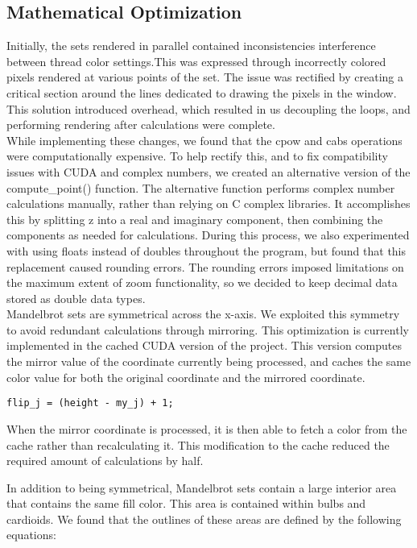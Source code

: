 \documentclass{article}
\begin{document}
\subsection{Mathematical Optimization}

Initially, the sets rendered in parallel contained inconsistencies interference between thread color settings.This was expressed through incorrectly colored pixels rendered at various points of the set.
The issue was rectified by creating a critical section around the lines dedicated to drawing the pixels in the window.
This solution introduced overhead, which resulted in us decoupling the loops, and performing rendering after calculations were complete.\\

While implementing these changes, we found that the cpow and cabs operations were computationally expensive.
To help rectify this, and to fix compatibility issues with CUDA and complex numbers, we created an alternative version of the compute\_point() function.
The alternative function performs complex number calculations manually, rather than relying on C complex libraries.
It accomplishes this by splitting z into a real and imaginary component, then combining the components as needed for calculations.
During this process, we also experimented with using floats instead of doubles throughout the program, but found that this replacement caused rounding errors.
The rounding errors imposed limitations on the maximum extent of zoom functionality, so we decided to keep decimal data stored as double data types.\\

Mandelbrot sets are symmetrical across the x-axis.
We exploited this symmetry to avoid redundant calculations through mirroring.
This optimization is currently implemented in the cached CUDA version of the project.
This version computes the mirror value of the coordinate currently being processed, and caches the same color value for both the original coordinate and the mirrored coordinate.

\begin{verbatim}
flip_j = (height - my_j) + 1;
\end{verbatim}

When the mirror coordinate is processed, it is then able to fetch a color from the cache rather than recalculating it.
This modification to the cache reduced the required amount of calculations by half.

In addition to being symmetrical, Mandelbrot sets contain a large interior area that contains the same fill color.
 This area is contained within bulbs and cardioids.
  We found that the outlines of these areas are defined by the following equations:
\end{document}
